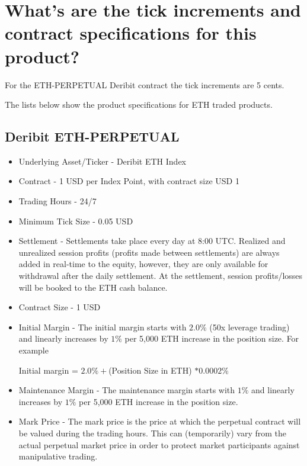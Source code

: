 \section{What's are the tick increments and contract specifications for this product?}
For the ETH-PERPETUAL Deribit contract the tick increments are 5 cents.

The lists below show the product specifications for ETH traded products.
\subsection{Deribit ETH-PERPETUAL \cite{perp}}
\begin{itemize}
\item Underlying Asset/Ticker - Deribit ETH Index 
 
\item Contract - 1 USD per Index Point, with contract size USD 1 
 
\item Trading Hours - 24/7 
 
\item Minimum Tick Size - 0.05 USD

\item Settlement - Settlements take place every day at 8:00 UTC. Realized and unrealized session profits (profits made between settlements) are always added in real-time to the equity, however, they are only available for withdrawal after the daily settlement. At the settlement, session profits/losses will be booked to the ETH cash balance.

\item Contract Size - 1 USD
 
\item Initial Margin - The initial margin starts with $2.0 \%$ (50x leverage trading) and linearly increases by $1 \%$ per 5,000 ETH increase in the position size.
For example
 

Initial margin = $2.0 \%  + $(Position Size in ETH) $ * 0.0002\%$ 
 
\item Maintenance Margin - 	
The maintenance margin starts with $1 \%$ and linearly increases by $1 \%$ per 5,000 ETH increase in the position size.
 
\item Mark Price - The mark price is the price at which the perpetual contract will be valued during the trading hours. This can (temporarily) vary from the actual perpetual market price in order to protect market participants against manipulative trading.


\end{itemize}
